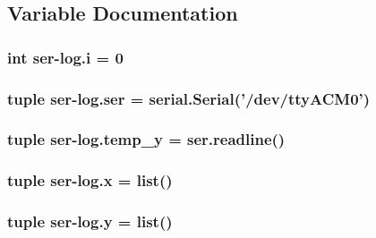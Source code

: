 \subsection{Variable Documentation}
\hypertarget{namespaceser-log_a07a12eb5896dee0953b2f34bf4e3e0d8}{
\subsubsection[{i}]{\setlength{\rightskip}{0pt plus 5cm}int {\bf ser}-\/log.\-i = 0}}\label{namespaceser-log_a07a12eb5896dee0953b2f34bf4e3e0d8}
\hypertarget{namespaceser-log_ae5e2c2855fe8c235874474c5277745ac}{
\subsubsection[{ser}]{\setlength{\rightskip}{0pt plus 5cm}tuple ser-\/log.\-ser = {\bf serial.\-Serial}('/dev/tty\-A\-C\-M0')}}\label{namespaceser-log_ae5e2c2855fe8c235874474c5277745ac}
\hypertarget{namespaceser-log_af746ba3a68039d15d0a46e905dc990d2}{
\subsubsection[{temp\-\_\-y}]{\setlength{\rightskip}{0pt plus 5cm}tuple {\bf ser}-\/log.\-temp\-\_\-y = ser.\-readline()}}\label{namespaceser-log_af746ba3a68039d15d0a46e905dc990d2}
\hypertarget{namespaceser-log_ad4c918427408ee85c0def9ccf3a8cdaa}{
\subsubsection[{x}]{\setlength{\rightskip}{0pt plus 5cm}tuple {\bf ser}-\/log.\-x = list()}}\label{namespaceser-log_ad4c918427408ee85c0def9ccf3a8cdaa}
\hypertarget{namespaceser-log_a6381ab980f595f0e94c91312cc3020c5}{
\subsubsection[{y}]{\setlength{\rightskip}{0pt plus 5cm}tuple {\bf ser}-\/log.\-y = list()}}\label{namespaceser-log_a6381ab980f595f0e94c91312cc3020c5}
